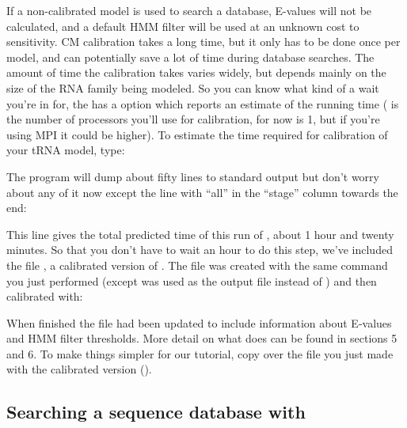 If a non-calibrated model is used to search a database, E-values will not
be calculated, and a default HMM filter will be used at an unknown
cost to sensitivity. CM calibration takes a long time, but it only has
to be done once per model, and can potentially save a lot of time
during database searches. The amount of time the calibration takes
varies widely, but depends mainly on the size of the RNA family being
modeled. 
So you can know what kind of a wait you're in for, the
 has a  option which reports an
estimate of the running time ( is the number of processors
you'll use for calibration, for now 
is 1, but if you're using MPI it could be higher). To estimate the
time required for calibration of your tRNA
model, type:


The program will dump about fifty lines to standard output but 
don't worry about any of it now except the line with ``all'' in the
``stage'' column towards the end:

\begin{sreoutput}
  # all         -    -    -     -   -   -         -      -       01:17:32}
\end{sreoutput}

This line gives the total predicted time of this run of
, about 1 hour and twenty minutes. So that you
don't have to wait an hour to do this step, we've included the file
, a calibrated version of . The
 file was created with the same  command
you just performed (except  was used as the output file
instead of ) and then calibrated with:


When  finished the  file had
been updated to include information about E-values and HMM filter
thresholds. More detail on what  does can be found
in sections 5 and 6. To make things simpler for our tutorial, copy over
the  file you just made with the calibrated version 
().

\subsection{Searching a sequence database with }

